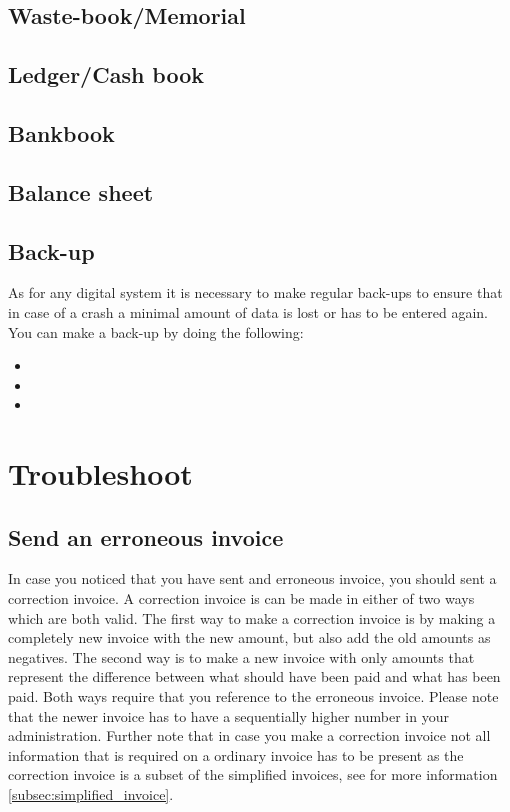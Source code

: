 \documentclass{report}
\begin{document}
\subsection{Waste-book/Memorial}
\subsection{Ledger/Cash book}
\subsection{Bankbook}
\subsection{Balance sheet}
\subsection{Back-up}
As for any digital system it is necessary to make regular back-ups to ensure that in case of a crash a minimal amount of data is lost or has to be entered again. You can make a back-up by doing the following:
\begin{itemize}
\item 
\item 
\item 
\end{itemize} 
\section{Troubleshoot}
\subsection{Send an erroneous invoice}
In case you noticed that you have sent and erroneous invoice, you should sent a correction invoice. A correction invoice is can be made in either of two ways which are both valid. 
The first way to make a correction invoice is by making a completely new invoice with the new amount, but also add the old amounts as negatives.
The second way is to make a new invoice with only amounts that represent the difference between what should have been paid and what has been paid. 
Both ways require that you reference to the erroneous invoice. Please note that the newer invoice has to have a sequentially higher number in your administration. Further note that in case you make a correction invoice not all information that is required on a ordinary invoice has to be present as the correction invoice is a subset of the simplified invoices, see for more information \ref{subsec:simplified_invoice}.
\end{document}
